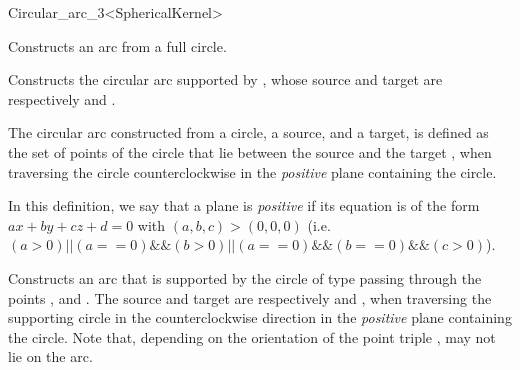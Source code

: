\begin{ccRefClass}{Circular_arc_3<SphericalKernel>}


\ccIsModel


\ccCreation
{}

\ccThreeToTwo

{Constructs an arc from a full circle.}

{Constructs the circular arc supported by , whose source and target 
are respectively  and .
}

The circular arc constructed from a circle, a source, and a target, is
defined as the set of points of the circle that lie between the source
 and the target , when traversing the circle
counterclockwise in the \textit{positive} plane containing the circle.

In this definition, we say that a plane is \textit{positive} if its
equation is of the form $ax+by+cz+d=0$ with $(a,b,c)>(0,0,0)$
(i.e. $(a>0) || (a==0) \&\& (b>0) || (a==0)\&\&(b==0)\&\&(c>0)$).

{Constructs an arc that is supported by the circle of type
   passing through the points ,
   and . The source and target are respectively 
  and , when traversing the supporting circle in the
  counterclockwise direction in the \textit{positive} plane containing
  the circle. 
  Note that, depending on the orientation of the point triple
  ,  may not lie on the arc. 
}

\ccAccessFunctions

\ccThreeToTwo



\end{ccRefClass}
